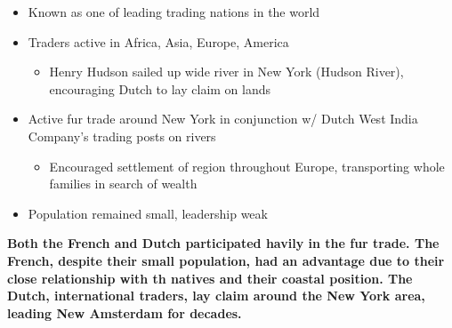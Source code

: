\documentclass[a4paper]{article}
\begin{document}
{\begin{itemize}
                \begin{itemize}
                    \item Known as one of leading trading nations in the world
                    \item Traders active in Africa, Asia, Europe, America
                    \begin{itemize}
                        \item Henry Hudson sailed up wide river in New York (Hudson River), encouraging Dutch to lay claim on lands
                    \end{itemize}
                    \item Active fur trade around New York in conjunction w/ Dutch West India Company's trading posts on rivers
                    \begin{itemize}
                        \item Encouraged settlement of region throughout Europe, transporting whole families in search of wealth 
                    \end{itemize}
                    \item Population remained small, leadership weak
                \end{itemize}
            \end{itemize}
            \textbf{Both the French and Dutch participated havily in the fur trade. The French, despite their small population, had an advantage due to their close relationship with th natives and their coastal position. The Dutch, international traders, lay claim around the New York area, leading New Amsterdam for decades.}
        }
\end{document}
